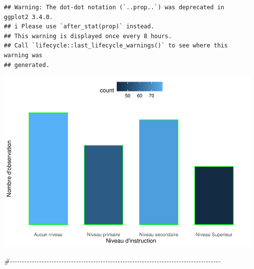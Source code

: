 \documentclass[
]{article}
\newenvironment{Shaded}{\begin{snugshade}}{\end{snugshade}}
\newcommand{\CommentTok}[1]{\textcolor[rgb]{0.56,0.35,0.01}{\textit{#1}}}
\begin{document}
\begin{verbatim}
## Warning: The dot-dot notation (`..prop..`) was deprecated in ggplot2 3.4.0.
## i Please use `after_stat(prop)` instead.
## This warning is displayed once every 8 hours.
## Call `lifecycle::last_lifecycle_warnings()` to see where this warning was
## generated.
\end{verbatim}

\includegraphics{PROJET_files/figure-latex/unnamed-chunk-18-1.pdf}

\begin{Shaded}
\begin{Highlighting}[]
\CommentTok{\#{-}{-}{-}{-}{-}{-}{-}{-}{-}{-}{-}{-}{-}{-}{-}{-}{-}{-}{-}{-}{-}{-}{-}{-}{-}{-}{-}{-}{-}{-}{-}{-}{-}{-}{-}{-}{-}{-}{-}{-}{-}{-}{-}{-}{-}{-}{-}{-}{-}{-}{-}{-}{-}{-}{-}{-}{-}{-}{-}{-}{-}{-}{-}{-}{-}{-}{-}{-}{-}{-}{-}{-}{-}{-}{-}{-}{-}{-}{-}{-}{-}{-}{-}{-}{-}{-}}
\end{Highlighting}
\end{Shaded}
\end{document}
